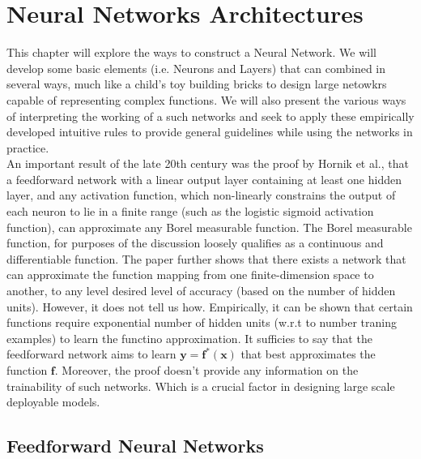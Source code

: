 
\chapter{Neural Networks Architectures} %

\label{nnarch} %


This chapter will explore the ways to construct a Neural Network. We will develop some basic elements (i.e. Neurons and Layers) that can combined in several ways, much like a child's toy building bricks to design large netowkrs capable of representing complex functions. We will also present the various ways of interpreting the working of a such networks and seek to apply these empirically developed intuitive rules to provide general guidelines while using the networks in practice.\\

An important result of the late 20th century was the proof by Hornik et al., that a feedforward network with a linear output layer containing at least one hidden layer, and any activation function, which non-linearly constrains the output of each neuron to lie in a finite range (such as
the logistic sigmoid activation function), can approximate any Borel measurable
function. The Borel measurable function, for purposes of the discussion loosely qualifies as a continuous and differentiable function. The paper further shows that there exists a network that can approximate the function mapping from one finite-dimension space to another, to any level desired level of accuracy (based on the number of hidden units). However, it does not tell us how. Empirically, it can be shown that certain functions require exponential number of hidden units (w.r.t to number traning examples) to learn the functino approximation. It sufficies to say that the feedforward network aims to learn $\bm{y}=\bm{f^{*}}(\bm{x})$ that best approximates the function $\bm{f}$. Moreover, the proof doesn't provide any information on the trainability of such networks. Which is a crucial factor in designing large scale deployable models.

\section{Feedforward Neural Networks}


